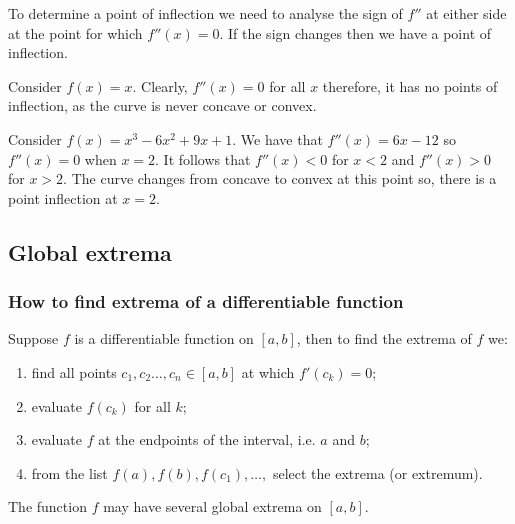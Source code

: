 \documentclass[12pt, a4paper]{article}
\begin{document}
\begin{mdnote}
    To determine a point of inflection we need to analyse the sign of \(f''\) at either side at the point for which \(f''(x)=0\). If the sign changes then we have a point of inflection.
\end{mdnote}

\begin{example}
    Consider \(f(x)=x\). Clearly, \(f''(x)=0\) for all \(x\) therefore, it has no points of inflection, as the curve is never concave or convex.
\end{example}

\begin{example}
    Consider \(f(x)=x^3-6x^2+9x+1\). We have that \(f''(x)=6x-12\) so \(f''(x) = 0\) when \(x=2\). It follows that \(f''(x)<0\) for \(x<2\) and \(f''(x)>0\) for \(x>2\). The curve changes from concave to convex at this point so, there is a point inflection at \(x=2\).
\end{example}

\subsection{Global extrema}

\subsubsection*{How to find extrema of a differentiable function}

Suppose \(f\) is a differentiable function on \([a,b]\), then to find the extrema of \(f\) we:

\begin{enumerate}
    \item find all points \(c_1,c_2 \ldots, c_n \in [a,b]\) at which \(f'(c_k)=0\);
    \item evaluate \(f(c_k)\) for all \(k\);
    \item evaluate \(f\) at the endpoints of the interval, i.e. \(a\) and \(b\);
    \item from the list \(f(a),f(b),f(c_1), \ldots,\) select the extrema (or extremum).
\end{enumerate}

\begin{mdremark}
    The function \(f\) may have several global extrema on \([a,b]\).
\end{mdremark}
\end{document}
